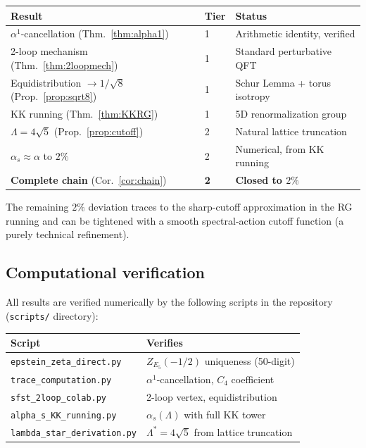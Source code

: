 \begin{center}
\renewcommand{\arraystretch}{1.2}
\begin{tabular}{lll}
\toprule
\textbf{Result} & \textbf{Tier} & \textbf{Status}\\
\midrule
$\alpha^1$-cancellation (Thm.~\ref{thm:alpha1})
  & 1 & Arithmetic identity, verified\\
2-loop mechanism (Thm.~\ref{thm:2loopmech})
  & 1 & Standard perturbative QFT\\
Equidistribution $\to 1/\!\sqrt{8}$
  (Prop.~\ref{prop:sqrt8})
  & 1 & Schur Lemma + torus isotropy\\
KK running (Thm.~\ref{thm:KKRG})
  & 1 & 5D renormalization group\\
$\Lambda = 4\sqrt{5}$ (Prop.~\ref{prop:cutoff})
  & 2 & Natural lattice truncation\\
$\alpha_s\approx\alpha$ to $2\%$
  & 2 & Numerical, from KK running\\
\midrule
\textbf{Complete chain} (Cor.~\ref{cor:chain})
  & \textbf{2} & \textbf{Closed to $2\%$}\\
\bottomrule
\end{tabular}
\end{center}

\noindent
The remaining $2\%$ deviation traces to the sharp-cutoff approximation
in the RG running and can be tightened with a smooth spectral-action
cutoff function (a purely technical refinement).

\subsection{Computational verification}

All results are verified numerically by the following scripts in the
repository (\texttt{scripts/} directory):

\begin{center}
\renewcommand{\arraystretch}{1.1}
\begin{tabular}{ll}
\toprule
\textbf{Script} & \textbf{Verifies}\\
\midrule
\texttt{epstein\_zeta\_direct.py}
  & $Z_{E_5}(-1/2)$ uniqueness (50-digit)\\
\texttt{trace\_computation.py}
  & $\alpha^1$-cancellation, $C_4$ coefficient\\
\texttt{sfst\_2loop\_colab.py}
  & 2-loop vertex, equidistribution\\
\texttt{alpha\_s\_KK\_running.py}
  & $\alpha_s(\Lambda)$ with full KK tower\\
\texttt{lambda\_star\_derivation.py}
  & $\Lambda^*=4\sqrt{5}$ from lattice truncation\\
\bottomrule
\end{tabular}
\end{center}
